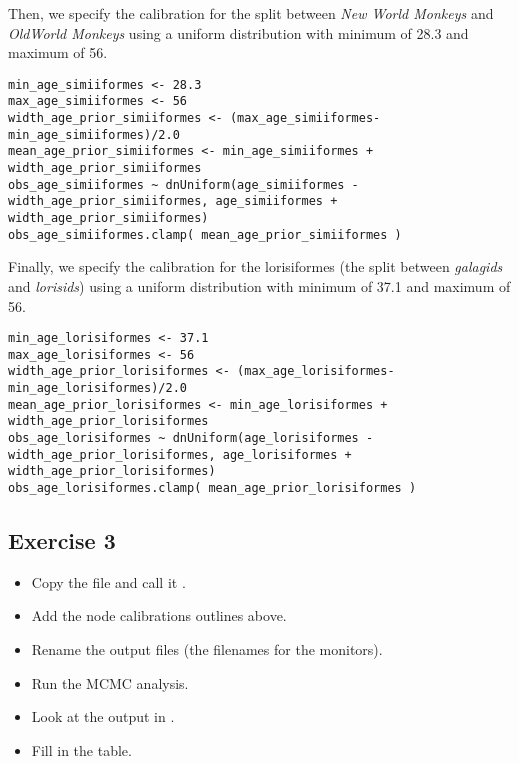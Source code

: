 Then, we specify the calibration for the split between \emph{New World Monkeys} and \emph{OldWorld Monkeys} using a uniform distribution with minimum of 28.3 and maximum of 56.
{\tt \begin{snugshade*}
\begin{lstlisting}
min_age_simiiformes <- 28.3
max_age_simiiformes <- 56
width_age_prior_simiiformes <- (max_age_simiiformes-min_age_simiiformes)/2.0
mean_age_prior_simiiformes <- min_age_simiiformes + width_age_prior_simiiformes
obs_age_simiiformes ~ dnUniform(age_simiiformes - width_age_prior_simiiformes, age_simiiformes + width_age_prior_simiiformes)
obs_age_simiiformes.clamp( mean_age_prior_simiiformes )
\end{lstlisting}
\end{snugshade*}}

Finally, we specify the calibration for the lorisiformes (the split between \emph{galagids} and \emph{lorisids}) using a uniform distribution with minimum of 37.1 and maximum of 56.
{\tt \begin{snugshade*}
\begin{lstlisting}
min_age_lorisiformes <- 37.1
max_age_lorisiformes <- 56
width_age_prior_lorisiformes <- (max_age_lorisiformes-min_age_lorisiformes)/2.0
mean_age_prior_lorisiformes <- min_age_lorisiformes + width_age_prior_lorisiformes
obs_age_lorisiformes ~ dnUniform(age_lorisiformes - width_age_prior_lorisiformes, age_lorisiformes + width_age_prior_lorisiformes)
obs_age_lorisiformes.clamp( mean_age_prior_lorisiformes )
\end{lstlisting}
\end{snugshade*}}


\subsection{Exercise 3}

\begin{itemize}
\item Copy the file  and call it .
\item Add the node calibrations outlines above.
\item Rename the output files (\IE the filenames for the monitors).
\item Run the MCMC analysis.
\item Look at the output in \Tracer.
\item Fill in the table.
\end{itemize}





